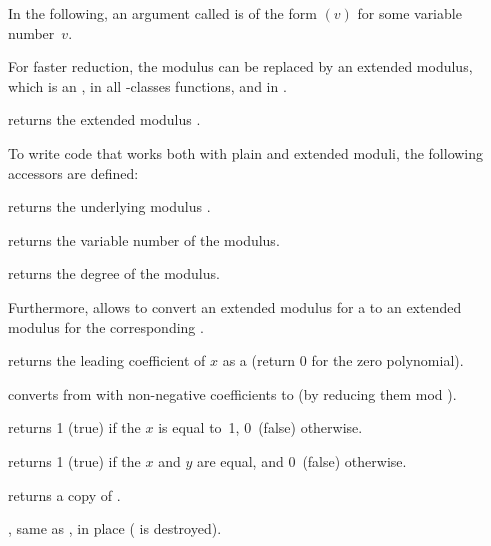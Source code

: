 \noindent In the following, an argument called  is of the form
$(v)$ for some variable number~$v$.


For faster reduction, the modulus  can be replaced by an extended
modulus, which is an , in all -classes functions, and in
.

 returns the extended modulus .

To write code that works both with plain and extended moduli, the following
accessors are defined:

 returns the underlying modulus .

 returns the variable number of the modulus.

 returns the degree of the modulus.

Furthermore,  allows to convert an extended modulus for
a  to an extended modulus for the corresponding .


 returns the leading coefficient of $x$ as a
 (return $0$ for the zero polynomial).

 converts from  with
non-negative coefficients to  (by reducing them mod ).

 returns 1 (true) if the  $x$ is equal
to~1, 0~(false) otherwise.

 returns 1 (true) if the  $x$
and $y$ are equal, and 0~(false) otherwise.

 returns a copy of .




, same as , in place
( is destroyed).




